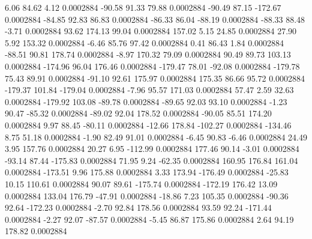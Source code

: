         6.06       84.62        4.12     0.0002884
      -90.58       91.33       79.88     0.0002884
      -90.49       87.15     -172.67     0.0002884
      -84.85       92.83       86.83     0.0002884
      -86.33       86.04      -88.19     0.0002884
      -88.33       88.48       -3.71     0.0002884
       93.62      174.13       99.04     0.0002884
      157.02        5.15       24.85     0.0002884
       27.90        5.92      153.32     0.0002884
       -6.46       85.76       97.42     0.0002884
        0.41       86.43        1.84     0.0002884
      -88.51       90.81      178.74     0.0002884
       -8.97      170.32       79.09     0.0002884
       90.49       89.73      103.13     0.0002884
     -174.96       96.04      176.46     0.0002884
     -179.47       78.01      -92.08     0.0002884
     -179.78       75.43       89.91     0.0002884
      -91.10       92.61      175.97     0.0002884
      175.35       86.66       95.72     0.0002884
     -179.37      101.84     -179.04     0.0002884
       -7.96       95.57      171.03     0.0002884
       57.47        2.59       32.63     0.0002884
     -179.92      103.08      -89.78     0.0002884
      -89.65       92.03       93.10     0.0002884
       -1.23       90.47      -85.32     0.0002884
      -89.02       92.04      178.52     0.0002884
      -90.05       85.51      174.20     0.0002884
        9.97       88.45      -80.11     0.0002884
      -12.66      178.84     -102.27     0.0002884
     -134.46        8.75       51.18     0.0002884
       -1.90       82.49       91.01     0.0002884
       -6.45       90.83       -6.46     0.0002884
       24.49        3.95      157.76     0.0002884
       20.27        6.95     -112.99     0.0002884
      177.46       90.14       -3.01     0.0002884
      -93.14       87.44     -175.83     0.0002884
       71.95        9.24      -62.35     0.0002884
      160.95      176.84      161.04     0.0002884
     -173.51        9.96      175.88     0.0002884
        3.33      173.94     -176.49     0.0002884
      -25.83       10.15      110.61     0.0002884
       90.07       89.61     -175.74     0.0002884
     -172.19      176.42       13.09     0.0002884
      133.04      176.79      -47.91     0.0002884
      -18.86        7.23      105.35     0.0002884
      -90.36       92.64     -172.23     0.0002884
       -2.70       92.84      178.56     0.0002884
       93.59       92.24     -171.44     0.0002884
       -2.27       92.07      -87.57     0.0002884
       -5.45       86.87      175.86     0.0002884
        2.64       94.19      178.82     0.0002884

